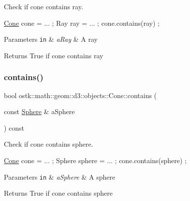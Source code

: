 Check if cone contains ray. 


\begin{DoxyCode}
\hyperlink{classostk_1_1math_1_1geom_1_1d3_1_1objects_1_1_cone_ac86773a78cf513900e8b0d3a2709bfcb}{Cone} cone = ... ;
Ray ray = ... ;
cone.contains(ray) ;
\end{DoxyCode}



\begin{DoxyParams}[1]{Parameters}
\mbox{\tt in}  & {\em a\+Ray} & A ray \\
\hline
\end{DoxyParams}
\begin{DoxyReturn}{Returns}
True if cone contains ray 
\end{DoxyReturn}
\mbox{\label{classostk_1_1math_1_1geom_1_1d3_1_1objects_1_1_cone_af5c0e153db61bc978038e8fbbc107844}} 
\subsubsection{\texorpdfstring{contains()}{contains()}\hspace{0.1cm}{\footnotesize\ttfamily [5/6]}}
{\footnotesize\ttfamily bool ostk\+::math\+::geom\+::d3\+::objects\+::\+Cone\+::contains (\begin{DoxyParamCaption}\item[{const \hyperlink{classostk_1_1math_1_1geom_1_1d3_1_1objects_1_1_sphere}{Sphere} \&}]{a\+Sphere }\end{DoxyParamCaption}) const}



Check if cone contains sphere. 


\begin{DoxyCode}
\hyperlink{classostk_1_1math_1_1geom_1_1d3_1_1objects_1_1_cone_ac86773a78cf513900e8b0d3a2709bfcb}{Cone} cone = ... ;
Sphere sphere = ... ;
cone.contains(sphere) ;
\end{DoxyCode}



\begin{DoxyParams}[1]{Parameters}
\mbox{\tt in}  & {\em a\+Sphere} & A sphere \\
\hline
\end{DoxyParams}
\begin{DoxyReturn}{Returns}
True if cone contains sphere 
\end{DoxyReturn}
\mbox{\label{classostk_1_1math_1_1geom_1_1d3_1_1objects_1_1_cone_a2305330aab422c044ff6a05b5b36101c}} 

